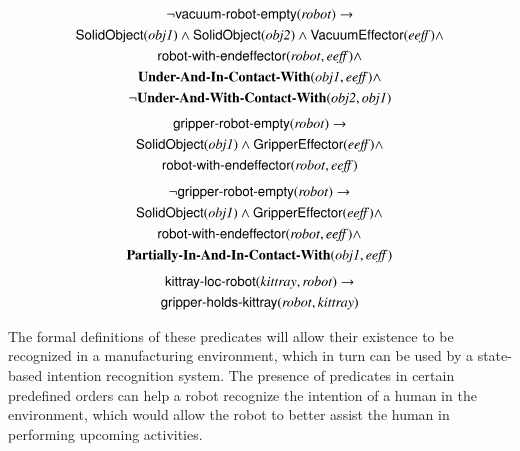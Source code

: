 \documentclass[preprint,12pt]{elsarticle}
\newcommand{\class}[1] {\textsf{#1}}
\newcommand{\stvar}[1] {\textsf{#1}}
\begin{document}
\begin{gather}
\label{eq:neg-vacuum-robot-empty}
\neg\stvar{vacuum-robot-empty}(\mathit{robot}) \rightarrow \\
\class{SolidObject}(\mathit{obj1}) \wedge \class{SolidObject}(\mathit{obj2}) \wedge \class{VacuumEffector}(\mathit{eeff}) \wedge\notag\\
\stvar{robot-with-endeffector}(\mathit{robot},\mathit{eeff}) \wedge \notag\\ \textbf{Under-And-In-Contact-With}(\mathit{obj1},\mathit{eeff}) \wedge \notag\\
\neg \textbf{Under-And-With-Contact-With}(\mathit{obj2},\mathit{obj1})\notag
\end{gather}
\begin{gather}
\label{eq:gripper-robot-empty}
\stvar{gripper-robot-empty}(\mathit{robot}) \rightarrow \\
\class{SolidObject}(\mathit{obj1}) \wedge \class{GripperEffector}(\mathit{eeff}) \wedge\notag\\
\stvar{robot-with-endeffector}(\mathit{robot},\mathit{eeff}) \notag
\end{gather}
\begin{gather}
\label{eq:neg-gripper-robot-empty}
\neg\stvar{gripper-robot-empty}(\mathit{robot}) \rightarrow \\
\class{SolidObject}(\mathit{obj1}) \wedge \class{GripperEffector}(\mathit{eeff}) \wedge\notag\\
\stvar{robot-with-endeffector}(\mathit{robot},\mathit{eeff}) \wedge\notag\\
\textbf{Partially-In-And-In-Contact-With}(\mathit{obj1},\mathit{eeff})\notag
\end{gather}
\begin{gather}
\label{eq:kittray-loc-robot}
\stvar{kittray-loc-robot}(\mathit{kittray},\mathit{robot}) \rightarrow \\
\stvar{gripper-holds-kittray}(\mathit{robot},\mathit{kittray}) \notag
\end{gather}


The formal definitions of these predicates will allow their existence to be recognized in a manufacturing environment, which in turn can be used by a state-based intention recognition system. The presence of predicates in certain predefined orders can help a robot recognize the intention of a human in the environment, which would allow the robot to better assist the human in performing upcoming activities.

\end{document}
